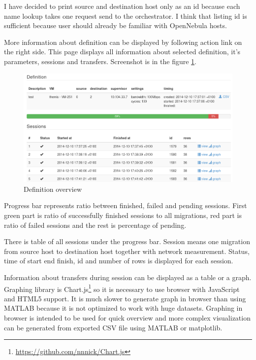 I have decided to print source and destination host only as an id because each name lookup takes one request send to the orchestrator. I think that listing id is sufficient because user should already be familiar with OpenNebula hosts. 

More information about definition can be displayed by following  action link on the right side. This page displays all information about selected definition, it's parameters, sessions and transfers. Screenshot is in the figure \ref{img:themis-definition}.

\begin{figure}[htb]
	\begin{center}
	\includegraphics[width=\textwidth]{themis-definition.png}
	\end{center}
	\caption{Definition overview}
	\label{img:themis-definition}
\end{figure}

Progress bar represents ratio between finished, failed and pending sessions. First green part is ratio of successfully finished sessions to all migrations, red part is ratio of failed sessions and the rest is percentage of pending. 

There is table of all sessions under the progress bar. Session means one migration from source host to destination host together with network measurement.
Status, time of start end finish, id and number of rows is displayed for each session.

Information about transfers during session can be displayed as a table or a graph. Graphing library is Chart.js\footnote{\url{https://github.com/nnnick/Chart.js}} so it is necessary to use browser with JavaScript and \Ac{HTML}5 support. It is much slower to generate graph in browser than using MATLAB because it is not optimized to work with huge datasets. Graphing in browser is intended to be used for quick overview and more complex visualization can be generated from exported \Ac{CSV} file using MATLAB or matplotlib.

